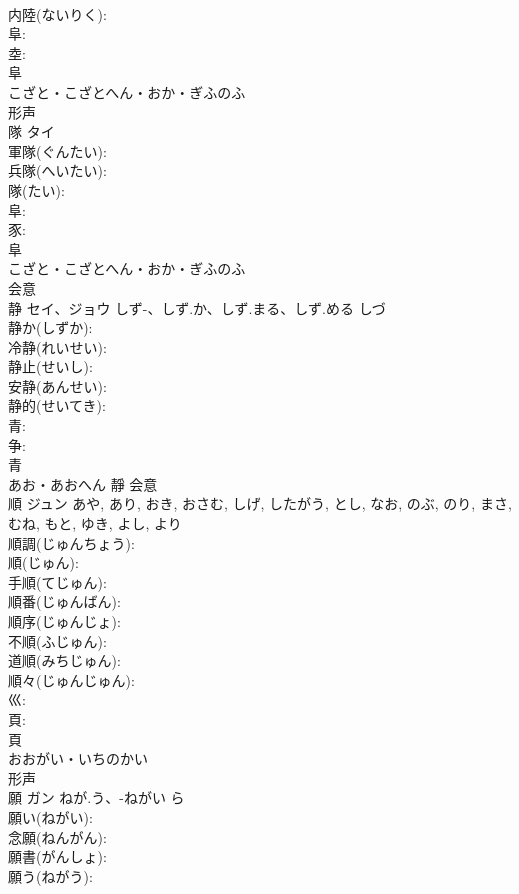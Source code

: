 \documentclass[8pt]{extreport}
\begin{document}
\begin{CJK}{UTF8}{min}
\\	内陸(ないりく): 
\\	阜: 
\\	坴: 
\\	阜	
\\	こざと・こざとへん・おか・ぎふのふ	
\\	形声 
\\	隊	タイ			
\\	軍隊(ぐんたい): 
\\	兵隊(へいたい): 
\\	隊(たい): 
\\	阜: 
\\	豕: 
\\	阜	
\\	こざと・こざとへん・おか・ぎふのふ	
\\	会意 
\\	静	セイ、ジョウ	しず-、しず.か、しず.まる、しず.める	しづ	
\\	静か(しずか): 
\\	冷静(れいせい): 
\\	静止(せいし): 
\\	安静(あんせい): 
\\	静的(せいてき): 
\\	青: 
\\	争: 
\\	青	
\\	あお・あおへん	靜	会意 
\\	順	ジュン		あや, あり, おき, おさむ, しげ, したがう, とし, なお, のぶ, のり, まさ, むね, もと, ゆき, よし, より	
\\	順調(じゅんちょう): 
\\	順(じゅん): 
\\	手順(てじゅん): 
\\	順番(じゅんばん): 
\\	順序(じゅんじょ): 
\\	不順(ふじゅん): 
\\	道順(みちじゅん): 
\\	順々(じゅんじゅん): 
\\	巛: 
\\	頁: 
\\	頁	
\\	おおがい・いちのかい	
\\	形声 
\\	願	ガン	ねが.う、-ねがい	ら	
\\	願い(ねがい): 
\\	念願(ねんがん): 
\\	願書(がんしょ): 
\\	願う(ねがう): 

\end{CJK}
\end{document}
